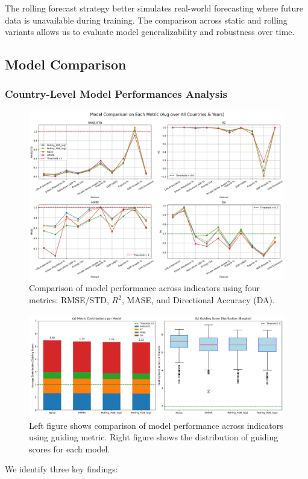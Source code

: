 \documentclass[12pt]{article}
\begin{document}
The rolling forecast strategy better simulates real-world forecasting where future data is unavailable during training. The comparison across static and rolling variants allows us to evaluate model generalizability and robustness over time.

\subsection{Model Comparison}

\subsubsection*{Country-Level Model Performances Analysis}
\begin{figure}[H]
    \centering
    \includegraphics[width=\textwidth]{featurewise_model_comparison.png}
    \caption{Comparison of model performance across indicators using four metrics: RMSE/STD, $R^2$, MASE, and Directional Accuracy (DA). }
    \label{fig:indicator_comparison}
\end{figure}

\begin{figure}[h]
    \centering
    \includegraphics[width=\textwidth]{guiding_score_combined.png}
    \caption{Left figure shows comparison of model performance across indicators using guiding metric. Right figure shows the distribution of guiding scores for each model.}
    \label{fig:indicator_comparison_2}
\end{figure}
We identify three key findings:
\end{document}
